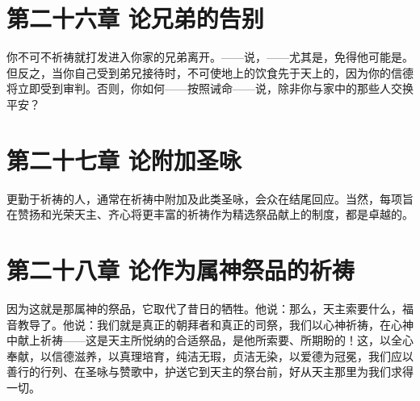 
\section{第二十六章  论兄弟的告别}

你不可不祈祷就打发进入你家的兄弟离开。——说，——尤其是，免得他可能是。但反之，当你自己受到弟兄接待时，不可使地上的饮食先于天上的，因为你的信德将立即受到审判。否则，你如何——按照诫命——说，除非你与家中的那些人交换平安？\par


\section{第二十七章  论附加圣咏}

更勤于祈祷的人，通常在祈祷中附加及此类圣咏，会众在结尾回应。当然，每项旨在赞扬和光荣天主、齐心将更丰富的祈祷作为精选祭品献上的制度，都是卓越的。\par


\section{第二十八章  论作为属神祭品的祈祷}

因为这就是那属神的祭品，它取代了昔日的牺牲。他说：那么，天主索要什么，福音教导了。他说：我们就是真正的朝拜者和真正的司祭，我们以心神祈祷，在心神中献上祈祷——这是天主所悦纳的合适祭品，是他所索要、所期盼的！这，以全心奉献，以信德滋养，以真理培育，纯洁无瑕，贞洁无染，以爱德为冠冕，我们应以善行的行列、在圣咏与赞歌中，护送它到天主的祭台前，好从天主那里为我们求得一切。\par


